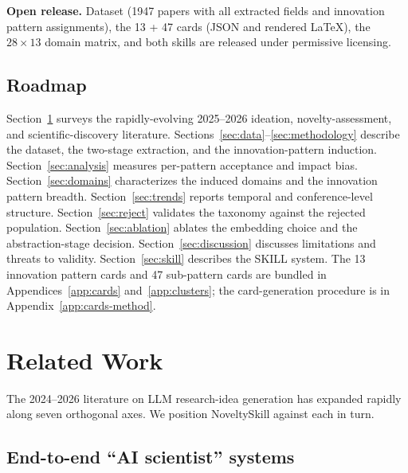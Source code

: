 \documentclass[10pt,a4paper]{article}
\begin{document}
\textbf{Open release.} Dataset (1947 papers with all extracted fields and innovation pattern assignments), the 13 + 47 cards (JSON and rendered LaTeX), the \(28{\times}13\) domain matrix, and both skills are released under permissive licensing.

\subsection{Roadmap}

Section~\ref{sec:related} surveys the rapidly-evolving 2025--2026 ideation, novelty-assessment, and scientific-discovery literature. Sections~\ref{sec:data}--\ref{sec:methodology} describe the dataset, the two-stage extraction, and the innovation-pattern induction. Section~\ref{sec:analysis} measures per-pattern acceptance and impact bias. Section~\ref{sec:domains} characterizes the induced domains and the innovation pattern breadth. Section~\ref{sec:trends} reports temporal and conference-level structure. Section~\ref{sec:reject} validates the taxonomy against the rejected population. Section~\ref{sec:ablation} ablates the embedding choice and the abstraction-stage decision. Section~\ref{sec:discussion} discusses limitations and threats to validity. Section~\ref{sec:skill} describes the SKILL system. The 13 innovation pattern cards and 47 sub-pattern cards are bundled in Appendices~\ref{app:cards} and~\ref{app:clusters}; the card-generation procedure is in Appendix~\ref{app:cards-method}.


\section{Related Work}
\label{sec:related}

The 2024--2026 literature on LLM research-idea generation has expanded rapidly along seven orthogonal axes. We position NoveltySkill against each in turn.

\subsection{End-to-end ``AI scientist'' systems}
\label{subsec:related-scientist}
\end{document}
